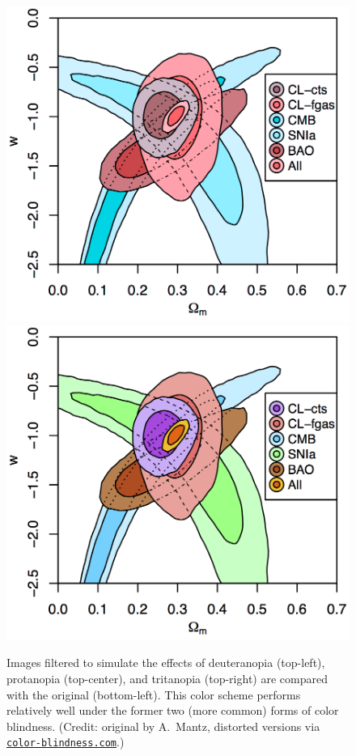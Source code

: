 \documentclass[letterpaper,11pt]{article}
\begin{document}
\begin{figure}
 \includegraphics[scale=0.18]{figures/color_contours_trit}
 \includegraphics[scale=0.75]{figures/color_contours_normal}
 \hspace{5mm}
 \begin{minipage}[b]{0.6\textwidth}
   \caption{
     Images filtered to simulate the effects of deuteranopia (top-left), protanopia (top-center), and tritanopia (top-right) are compared with the original (bottom-left). This color scheme performs relatively well under the former two (more common) forms of color blindness. (Credit: original by A.~Mantz, distorted versions via \href{http://www.color-blindness.com/coblis-color-blindness-simulator/}{\tt color-blindness.com}.)
   }
   \label{fig:colorcontours}
   \vspace{15mm}
 \end{minipage}
\end{figure}
\end{document}
